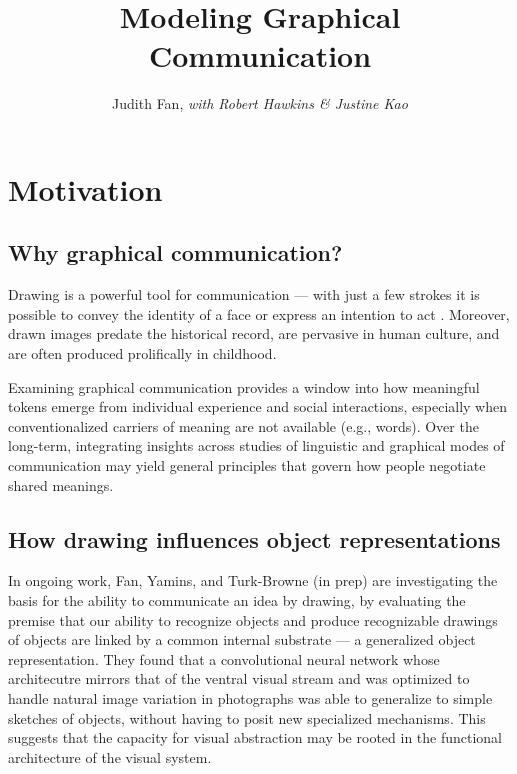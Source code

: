 \documentclass[12pt]{article}
\title{\textbf{Modeling Graphical Communication}}
\author{Judith Fan, \textit{with Robert Hawkins \& Justine Kao}}
\begin{document}
\maketitle %

\section{Motivation}

\subsection{Why graphical communication?}

Drawing is a powerful tool for communication --- with just a few strokes it is possible to convey the identity of a face \cite{bergmann2013impact} or express an intention to act \cite{Galantucci:2005uh}. Moreover, drawn images predate the historical record, are pervasive in human culture, and are often produced prolifically in childhood.

Examining graphical communication provides a window into how meaningful tokens emerge from individual experience and social interactions, especially when conventionalized carriers of meaning are not available (e.g., words). Over the long-term, integrating insights across studies of linguistic and graphical modes of communication may yield general principles that govern how people negotiate shared meanings.  

\subsection{How drawing influences object representations}

In ongoing work, Fan, Yamins, and Turk-Browne (in prep) are investigating the basis for the ability to communicate an idea by drawing, by evaluating the premise that our ability to recognize objects and produce recognizable drawings of objects are linked by a common internal substrate --- a generalized object representation. They found that a convolutional neural network whose architecutre mirrors that of the ventral visual stream and was optimized to handle natural image variation in photographs \cite{Yamins:2014gia} was able to generalize to simple sketches of objects, without having to posit new specialized mechanisms. This suggests that the capacity for visual abstraction may be rooted in the functional architecture of the visual system.
\end{document}
